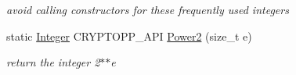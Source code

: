 \begin{DoxyCompactItemize}
\begin{DoxyCompactList}\small\item\em avoid calling constructors for these frequently used integers \item\end{DoxyCompactList}\item 
\hypertarget{class_integer_afdb02d7beb4d469bd4b0320f2ac83d9a}{
static \hyperlink{class_integer}{Integer} CRYPTOPP\_\-API \hyperlink{class_integer_afdb02d7beb4d469bd4b0320f2ac83d9a}{Power2} (size\_\-t e)}
\label{class_integer_afdb02d7beb4d469bd4b0320f2ac83d9a}

\begin{DoxyCompactList}\small\item\em return the integer 2$\ast$$\ast$e \item\end{DoxyCompactList}\end{DoxyCompactItemize}
